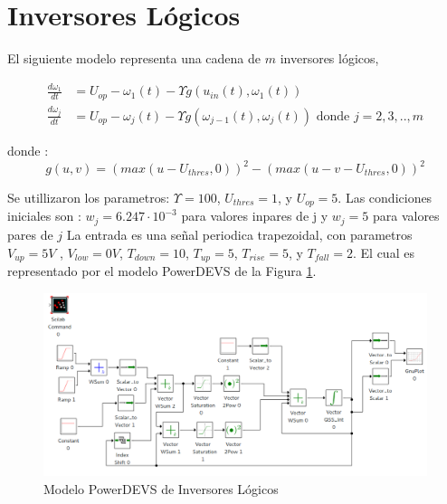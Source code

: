 \section{Inversores Lógicos}
	El siguiente modelo representa una cadena de $m$ inversores lógicos, 

\begin{align*}
\frac{d \omega_1}{d t} & = U_{op} - \omega_1(t) - \Upsilon g (u_{in}(t), \omega_{1} (t))    \\
\frac{d \omega_j}{d t} & = U_{op} - \omega_j(t) - \Upsilon g (\omega_{j-1}(t), \omega_{j} (t)) \textrm{ donde $j = 2, 3, .., m$}
\end{align*}

donde :
\begin{equation*}
	g(u, v) = (max(u - U_{thres} , 0))^2 - (max (u - v - U_{thres} , 0))^2
\end{equation*}

Se utillizaron los parametros: $\Upsilon = 100$,  $U_{thres} = 1$, y $U_{op} = 5$.
Las condiciones iniciales son : $w_j = 6.247 \cdot 10^{-3}$ para valores inpares de j y $w_j = 5$ para valores pares de $j$
La entrada es una señal periodica trapezoidal, con parametros 
$V_{up} = 5V$ , $V_{low} = 0V$, $T_{down} = 10$, $T_{up} = 5$, $T_{rise} = 5$, y $T_{fall} = 2$.
El cual es representado por el modelo PowerDEVS de la Figura \ref{model:inverters}.

\begin{figure}[H]
\includegraphics[width=0.75\linewidth]{inverters}
\caption{Modelo PowerDEVS de Inversores Lógicos}\label{model:inverters}
\end{figure}

